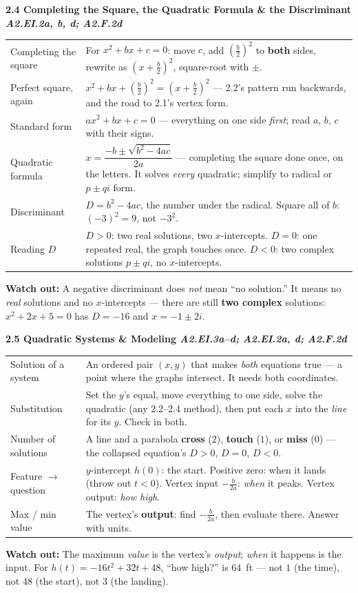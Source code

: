 \documentclass[10pt]{article}
\newcommand{\sghead}[2]{%
  \boxguard[10]%
  \vspace{4pt}\par\noindent
  \colorbox{forest}{\parbox{\dimexpr\linewidth-2\fboxsep}{%
    \small\color{white}\bfseries #1 \hfill \textmd{\itshape\scriptsize\color{forestmid} #2}}}%
  \vspace{2pt}\par}
\newcommand{\sgwatch}[1]{%
  \vspace{1pt}\par\noindent
  \colorbox{redbg}{\parbox{\dimexpr\linewidth-2\fboxsep}{%
    \footnotesize\textbf{\textcolor{redacc}{Watch out:}} #1}}%
  \vspace{1pt}\par}
\newcommand{\sgtabsetup}{\renewcommand{\arraystretch}{1.06}\footnotesize}
\begin{document}
\sghead{2.4 \quad Completing the Square, the Quadratic Formula \& the Discriminant}{A2.EI.2a, b, d; A2.F.2d}
{\sgtabsetup
\begin{tabularx}{\linewidth}{@{} G X @{}}
Completing the square & For $x^2+bx+c=0$: move $c$, add $\left(\frac b2\right)^2$ to
  \textbf{both} sides, rewrite as $\left(x+\frac b2\right)^2$, square-root with $\pm$. \\
Perfect square, again & $x^2+bx+\left(\frac b2\right)^2=\left(x+\frac b2\right)^2$ --- 2.2's
  pattern run backwards, and the road to 2.1's vertex form. \\
Standard form & $ax^2+bx+c=0$ --- everything on one side \emph{first}; read $a$, $b$, $c$ with
  their signs. \\
Quadratic formula & $x=\dfrac{-b\pm\sqrt{b^2-4ac}}{2a}$ --- completing the square done once, on
  the letters. It solves \emph{every} quadratic; simplify to radical or $p\pm qi$ form. \\
Discriminant & $D=b^2-4ac$, the number under the radical. Square all of $b$: $(-3)^2=9$, not
  $-3^2$. \\
Reading $D$ & $D>0$: two real solutions, two $x$-intercepts. $D=0$: one repeated real, the graph
  touches once. $D<0$: two complex solutions $p\pm qi$, no $x$-intercepts. \\
\end{tabularx}}
\sgwatch{A negative discriminant does \emph{not} mean ``no solution.'' It means no \emph{real}
solutions and no $x$-intercepts --- there are still \textbf{two complex} solutions: $x^2+2x+5=0$
has $D=-16$ and $x=-1\pm2i$.}

\sghead{2.5 \quad Quadratic Systems \& Modeling}{A2.EI.3a--d; A2.EI.2a, d; A2.F.2d}
{\sgtabsetup
\begin{tabularx}{\linewidth}{@{} G X @{}}
Solution of a system & An ordered pair $(x,y)$ that makes \emph{both} equations true --- a point
  where the graphs intersect. It needs both coordinates. \\
Substitution & Set the $y$'s equal, move everything to one side, solve the quadratic (any 2.2--2.4
  method), then put each $x$ into the \emph{line} for its $y$. Check in both. \\
Number of solutions & A line and a parabola \textbf{cross} ($2$), \textbf{touch} ($1$), or
  \textbf{miss} ($0$) --- the collapsed equation's $D>0$, $D=0$, $D<0$. \\
Feature $\to$ question & $y$-intercept $h(0)$: the start. Positive zero: when it lands (throw out
  $t<0$). Vertex input $-\frac{b}{2a}$: \emph{when} it peaks. Vertex output: \emph{how high}. \\
Max / min value & The vertex's \textbf{output}: find $-\frac{b}{2a}$, then evaluate there. Answer
  with units. \\
\end{tabularx}}
\sgwatch{The maximum \emph{value} is the vertex's \emph{output}; \emph{when} it happens is the
input. For $h(t)=-16t^2+32t+48$, ``how high?'' is $64$~ft --- not $1$ (the time), not $48$ (the
start), not $3$ (the landing).}
\end{document}
